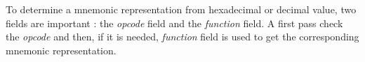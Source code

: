 	To determine a mnemonic representation from hexadecimal or decimal value, two fields are important : the \textit{opcode} field and the \textit{function} field. A first pass check the \textit{opcode} and then, if it is needed, \textit{function} field is used to get the corresponding mnemonic representation.